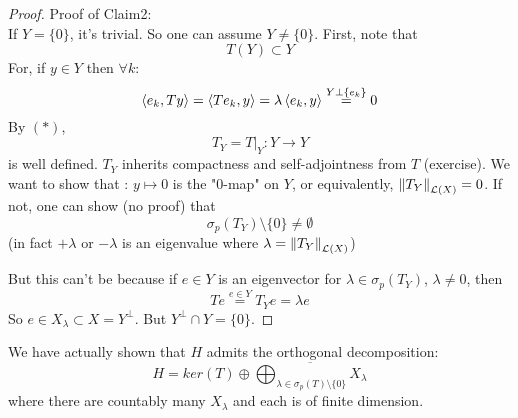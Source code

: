 \documentclass{article}
\begin{document}
\begin{proof}
	Proof of Claim2:\\
	If $Y=\{0\}$, it's trivial. So one can assume $Y\neq\{0\}$. First, note that
	\begin{equation}T(Y)\subset Y\tag{$*$}\end{equation}
	For, if $y\in Y$ then $\forall k$:
	\[\left<{e_k},{Ty}\right>=\left<{Te_k},{y}\right>=\lambda\left<{e_k},{y}\right>\stackrel{Y\perp\{e_k\}}{=}0\]
	By $(*)$,
	\[T_Y=T|_Y:Y\to Y\] is well defined. $T_Y$ inherits compactness and self-adjointness from $T$ (exercise). We want to show that : $y\mapsto0 $ is the  "0-map" on $Y$, or equivalently, $\left\|{T_Y}\right\|_{\mathcal{L}(X)}=0$. If not, one can show (no proof) that
	\[\sigma_p(T_Y)\setminus\{0\}\neq\emptyset\]
	(in fact $+\lambda$ or $-\lambda$ is an eigenvalue where $\lambda=\left\|{T_Y}\right\|_{\mathcal{L}(X)}$)   
     
 But this can't be because if $e\in Y$ is an eigenvector for $\lambda\in \sigma_p(T_Y)$, $\lambda\neq 0$, then
	\[Te\stackrel{e\in Y}{=}T_Y e=\lambda e\]
	So $e\in X_\lambda\subset X=Y^\perp$. But $Y^\perp\cap Y=\{0\}$.
\end{proof}
\begin{remark}
	We have actually shown that $H$ admits the orthogonal decomposition:
	\[H=ker(T)\oplus
		\overline{\bigoplus_{\lambda\in\sigma_p(T)\setminus\{0\}}X_\lambda}
	\]
	where there are countably many $X_\lambda$ and each is of finite dimension.
\end{remark}
\end{document}
